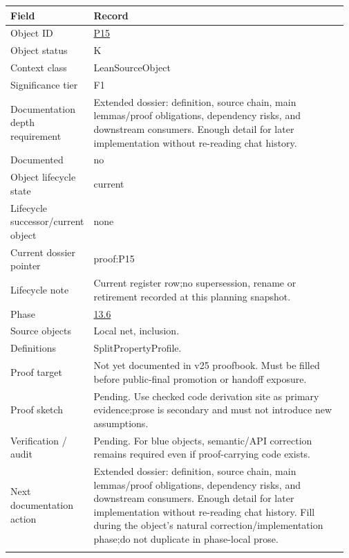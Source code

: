 \begin{longtable}{L{0.16\linewidth} L{0.81\linewidth}}
\hline
\textbf{Field} & \textbf{Record}\\
\hline
Object ID & \hyperlink{object-row-P15}{P15}\\
\hline\addlinespace[0.20em]
Object status & K\\
\hline\addlinespace[0.20em]
Context class & LeanSourceObject\\
\hline\addlinespace[0.20em]
Significance tier & F1\\
\hline\addlinespace[0.20em]
Documentation depth requirement & Extended dossier: definition, source chain, main lemmas/\allowbreak{}proof obligations, dependency risks, and downstream consumers. Enough detail for later implementation without re-reading chat history.\\
\hline\addlinespace[0.20em]
Documented & no\\
\hline\addlinespace[0.20em]
Object lifecycle state & current\\
\hline\addlinespace[0.20em]
Lifecycle successor/\allowbreak{}current object & none\\
\hline\addlinespace[0.20em]
Current dossier pointer & proof:P15\\
\hline\addlinespace[0.20em]
Lifecycle note & Current register row;\newline no supersession, rename or retirement recorded at this planning snapshot.\\
\hline\addlinespace[0.20em]
Phase & \hyperlink{phase-row-13-6}{13.6}\\
\hline\addlinespace[0.20em]
Source objects & Local net, inclusion.\\
\hline\addlinespace[0.20em]
Definitions & SplitPropertyProfile.\\
\hline\addlinespace[0.20em]
Proof target & Not yet documented in v25 proofbook. Must be filled before public-final promotion or handoff exposure.\\
\hline\addlinespace[0.20em]
Proof sketch & Pending. Use checked code derivation site as primary evidence;\newline prose is secondary and must not introduce new assumptions.\\
\hline\addlinespace[0.20em]
Verification /\allowbreak{} audit & Pending. For blue objects, semantic/\allowbreak{}API correction remains required even if proof-carrying code exists.\\
\hline\addlinespace[0.20em]
Next documentation action & Extended dossier: definition, source chain, main lemmas/\allowbreak{}proof obligations, dependency risks, and downstream consumers. Enough detail for later implementation without re-reading chat history. Fill during the object's natural correction/\allowbreak{}implementation phase;\newline do not duplicate in phase-local prose.\\
\hline\addlinespace[0.20em]
\end{longtable}
